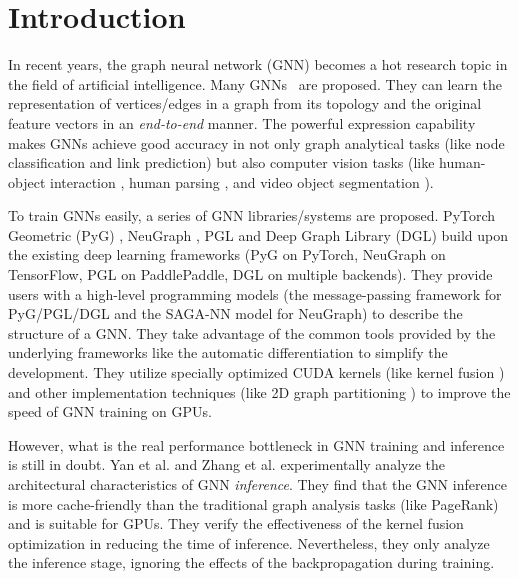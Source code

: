\section{Introduction}

In recent years, the graph neural network (GNN) becomes a hot research topic in the field of artificial intelligence.
%
Many GNNs~\cite{kipf2017_gcn, defferrad2016_chebnet, li2018_agcn,li2015_ggnn, hamilton2017_graphsage, huang2018_gat, zhang2018_gaan} are proposed.
%
They can learn the representation of vertices/edges in a graph from its topology and the original feature vectors in an \emph{end-to-end} manner.
%
The powerful expression capability makes GNNs achieve good accuracy in not only graph analytical tasks \cite{zhou2018_gnn_review, zhang2018_gnn_survey, comprehensive-survey-wu-2020} (like node classification and link prediction) but also computer vision tasks (like human-object interaction \cite{qi2018_learning_humanobject}, human parsing \cite{wang2020_hierarchical_human_parsing}, and video object segmentation \cite{wang2019_zeroshot_video}).

To train GNNs easily, a series of GNN libraries/systems \cite{PyG, DGL, ma2019_neugraph, zhu2019_aligraph, PGL} are proposed.
%
PyTorch Geometric (PyG) \cite{PyG}, NeuGraph \cite{ma2019_neugraph}, PGL \cite{PGL} and Deep Graph Library (DGL) \cite{DGL} build upon the existing deep learning frameworks (PyG on PyTorch, NeuGraph on TensorFlow, PGL on PaddlePaddle, DGL on multiple backends).
%
They provide users with a high-level programming models (the message-passing framework for PyG/PGL/DGL and the SAGA-NN model for NeuGraph) to describe the structure of a GNN.
%
They take advantage of the common tools provided by the underlying frameworks like the automatic differentiation to simplify the development.
%
They utilize specially optimized CUDA kernels (like kernel fusion \cite{DGL, ma2019_neugraph}) and other implementation techniques (like 2D graph partitioning \cite{ma2019_neugraph}) to improve the speed of GNN training on GPUs.

However, what is the real performance bottleneck in GNN training and inference is still in doubt.
%
Yan et al. \cite{yan2020_characterizing_gcn} and Zhang et al. \cite{zhang2020_analysis_neugraph} experimentally analyze the architectural characteristics of GNN \emph{inference}.
%
They find that the GNN inference is more cache-friendly than the traditional graph analysis tasks (like PageRank) and is suitable for GPUs.
%
They verify the effectiveness of the kernel fusion optimization in reducing the time of inference.
%
Nevertheless, they only analyze the inference stage, ignoring the effects of the backpropagation during training.

